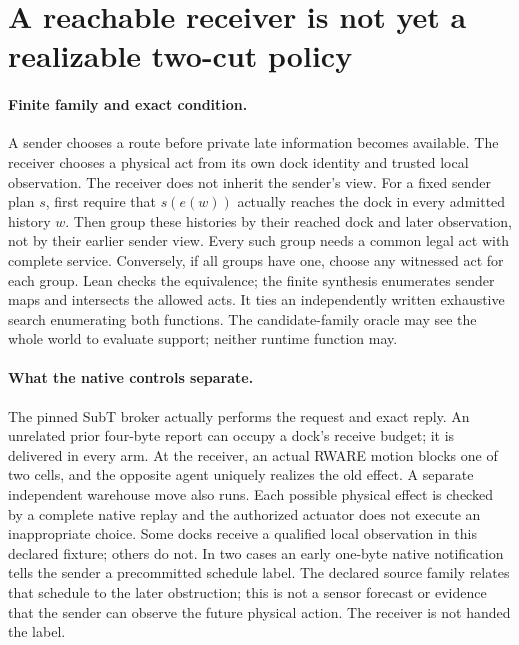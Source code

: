 \documentclass{article}
\begin{document}
\section*{A reachable receiver is not yet a realizable two-cut policy}
\paragraph{Finite family and exact condition.}
A sender chooses a route before private late information becomes
available. The receiver chooses a physical act from its own dock
identity and trusted local observation. The receiver does not
inherit the sender's view. For a fixed sender plan $s$,
first require that $s(e(w))$ actually reaches the dock in every
admitted history $w$. Then group these histories by their reached
dock and later observation, not by their earlier sender view.
Every such group needs a common legal act with complete service.
Conversely, if all groups have one, choose any witnessed act
for each group. Lean checks the equivalence; the finite synthesis
enumerates sender maps and intersects the allowed acts. It ties
an independently written exhaustive search enumerating both
functions. The candidate-family oracle may see the whole world
to evaluate support; neither runtime function may.

\paragraph{What the native controls separate.}
The pinned SubT broker actually performs the request and exact
reply. An unrelated prior four-byte report can occupy a dock's
receive budget; it is delivered in every arm. At the receiver,
an actual RWARE motion blocks one of two cells, and the opposite
agent uniquely realizes the old effect. A separate independent
warehouse move also runs. Each possible physical effect is
checked by a complete native replay and the authorized actuator
does not execute an inappropriate choice. Some docks receive
a qualified local observation in this declared fixture; others
do not. In two cases an early one-byte native notification tells
the sender a precommitted schedule label. The declared source
family relates that schedule to the later obstruction; this is
not a sensor forecast or evidence that the sender can observe the
future physical action. The receiver is not handed the label.
\end{document}
